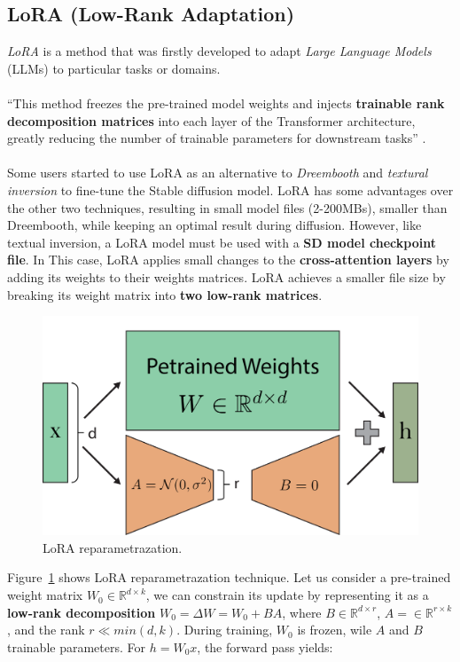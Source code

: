 \documentclass[preprint]{elsarticle}
\begin{document}
\subsection{LoRA (Low-Rank Adaptation)}

\emph{LoRA} \cite{hu2021lora} is a method that was firstly developed to adapt 
\emph{Large Language Models} (LLMs) to particular tasks or domains.\\ \\
``This method freezes 
the pre-trained model weights and injects \textbf{trainable rank decomposition matrices} 
into each layer of the Transformer architecture, greatly reducing the number of trainable 
parameters for downstream tasks'' \cite{hu2021lora}. \\\\
Some users started to use LoRA as an alternative to \emph{Dreembooth} \cite{ruiz2022dreambooth} 
and \emph{textural inversion} \cite{gal2022image} to 
fine-tune the Stable diffusion model. LoRA has some advantages over the other two techniques, 
resulting in small model files (2-200MBs), smaller than Dreembooth, 
while keeping an optimal result during diffusion. However, like textual inversion, 
a LoRA model must be used with a \textbf{SD model checkpoint file}.
In This case, LoRA applies small changes to the \textbf{cross-attention layers} by adding its 
weights to their weights matrices.
LoRA achieves a smaller file size by breaking its weight matrix into \textbf{two low-rank matrices}.


\begin{figure}[t]
	\centering
    \includegraphics[scale=0.62]{img/svg/LoRA.png}
	\caption{LoRA reparametrazation.}\label{fig:lora}
\end{figure}


Figure~\ref{fig:lora} shows LoRA reparametrazation technique. Let us consider a 
pre-trained weight matrix $W_0 \in \mathbb{R}^{d\times k}$, we can constrain its update
by representing it as a \textbf{low-rank decomposition} $W_0 = \Delta W=W_0+BA$, where $B \in \mathbb{R}^{d \times r}$,
$A= \in \mathbb{R}^{r \times k}$, and the rank $r \ll min(d,k)$.
During training, $W_0$ is frozen, wile $A$ and $B$ trainable parameters.
For $h = W_0x$, the forward pass yields:
\end{document}
